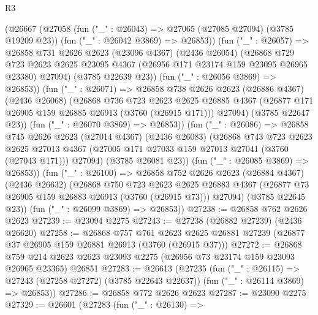 \begin{lexlean}{R3}
\begin{coremodule}
          (@26667
            (@27058
              (fun ("_" : @26043) => @27065 (@27085 @27094) (@3785 @19209 @23))
              (fun ("_" : @26042 @3869) => @26853))
            (fun ("_" : @26057) =>
            @26858
              @731
              @2626
              @2623
              (@23096 @4367)
              (@2436 @26054)
              (@26868
                @729
                @723
                @2623
                @2625
                @23095
                @4367
                (@26956 @171 @23174 @159 @23095 @26965 @23380)
                @27094)
              (@3785 @22639 @23))
            (fun ("_" : @26056 @3869) => @26853))
          (fun ("_" : @26071) =>
          @26858
            @738
            @2626
            @2623
            (@26886 @4367)
            (@2436 @26068)
            (@26868
              @736
              @723
              @2623
              @2625
              @26885
              @4367
              (@26877 @171 @26905 @159 @26885 @26913 (@3760 (@26915 @171)))
              @27094)
            (@3785 @22647 @23))
          (fun ("_" : @26070 @3869) => @26853))
        (fun ("_" : @26086) =>
        @26858
          @745
          @2626
          @2623
          (@27014 @4367)
          (@2436 @26083)
          (@26868
            @743
            @723
            @2623
            @2625
            @27013
            @4367
            (@27005 @171 @27033 @159 @27013 @27041 (@3760 (@27043 @171)))
            @27094)
          (@3785 @26081 @23))
        (fun ("_" : @26085 @3869) => @26853))
      (fun ("_" : @26100) =>
      @26858
        @752
        @2626
        @2623
        (@26884 @4367)
        (@2436 @26632)
        (@26868
          @750
          @723
          @2623
          @2625
          @26883
          @4367
          (@26877 @73 @26905 @159 @26883 @26913 (@3760 (@26915 @73)))
          @27094)
        (@3785 @22645 @23))
      (fun ("_" : @26099 @3869) => @26853))
@27238 := @26858 @762 @2626 @2623
@27239 := @23094 @2275
@27243 := @27238 (@26882 @27239) (@2436 @26620)
@27258 := @26868
    @757
    @761
    @2623
    @2625
    @26881
    @27239
    (@26877 @37 @26905 @159 @26881 @26913 (@3760 (@26915 @37)))
@27272 := @26868
    @759
    @214
    @2623
    @2623
    @23093
    @2275
    (@26956 @73 @23174 @159 @23093 @26965 @23365)
    @26851
@27283 := @26613
    (@27235
      (fun ("_" : @26115) => @27243 (@27258 @27272) (@3785 @22643 @22637))
      (fun ("_" : @26114 @3869) => @26853))
@27286 := @26858 @772 @2626 @2623
@27287 := @23090 @2275
@27329 := @26601
    (@27283
      (fun ("_" : @26130) =>

\end{coremodule}
\end{lexlean}
